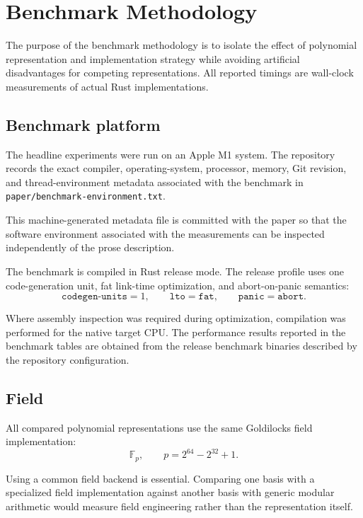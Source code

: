 \section{Benchmark Methodology}
\label{sec:methodology}

The purpose of the benchmark methodology is to isolate the effect of
polynomial representation and implementation strategy while avoiding
artificial disadvantages for competing representations. All reported
timings are wall-clock measurements of actual Rust implementations.

\subsection{Benchmark platform}

The headline experiments were run on an Apple M1 system. The repository
records the exact compiler, operating-system, processor, memory, Git
revision, and thread-environment metadata associated with the benchmark in
\texttt{paper/benchmark-environment.txt}.

This machine-generated metadata file is committed with the paper so that
the software environment associated with the measurements can be inspected
independently of the prose description.

The benchmark is compiled in Rust release mode. The release profile uses
one code-generation unit, fat link-time optimization, and abort-on-panic
semantics:
\[
\texttt{codegen-units}=1,
\qquad
\texttt{lto}=\texttt{fat},
\qquad
\texttt{panic}=\texttt{abort}.
\]

Where assembly inspection was required during optimization, compilation was
performed for the native target CPU. The performance results reported in
the benchmark tables are obtained from the release benchmark binaries
described by the repository configuration.

\subsection{Field}

All compared polynomial representations use the same Goldilocks field
implementation:
\[
\mathbb{F}_p,
\qquad
p=2^{64}-2^{32}+1.
\]

Using a common field backend is essential. Comparing one basis with a
specialized field implementation against another basis with generic modular
arithmetic would measure field engineering rather than the representation
itself.

